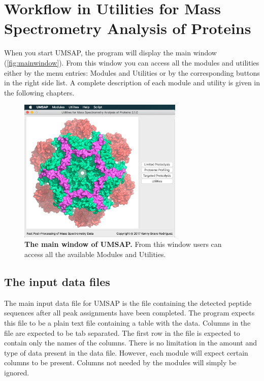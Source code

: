 \chapter{Workflow in Utilities for Mass Spectrometry Analysis of Proteins}
\label{chap:workflow}

When you start UMSAP, the program will display the main window (\autoref{fig:mainwindow}). From this window you can access all the modules and utilities either by the menu entries: Modules and Utilities or by the corresponding buttons in the right side list. A complete description of each module and utility is given in the following chapters.

\begin{figure}[h]
	\centering
	\includegraphics[width=0.7\textwidth]{./IMAGES/MAIN-WINDOW/mainwindow.jpg}	    
	\caption[The main window of UMSAP]{\textbf{The main window of UMSAP.} From this window users can access all the available Modules and Utilities.} 
	\label{fig:mainwindow}
	\vspace{-5pt} 	
\end{figure}  

\section{The input data files}
\label{sec:datafile}

The main input data file for UMSAP is the file containing the detected peptide sequences after all peak assignments have been completed. The program expects this file to be a plain text file containing a table with the data. Columns in the file are expected to be tab separated. The first row in the file is expected to contain only the names of the columns. There is no limitation in the amount and type of data present in the data file. However, each module will expect certain columns to be present. Columns not needed by the modules will simply be ignored.

